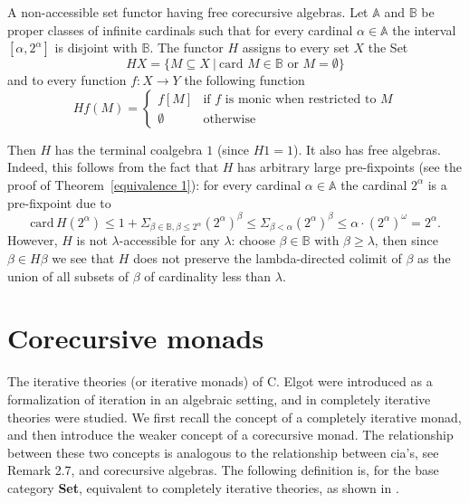 \documentclass{LMCS}
\theoremstyle{plain}
\theoremstyle{definition}
\numberwithin{equation}{section}
\def\card{\mathrm{card}\,}
\begin{document}
\begin{exa}
A non-accessible set functor having free corecursive algebras. Let $\mathbb A$ and $\mathbb B$ be proper classes of infinite cardinals such that for every cardinal $\alpha \in \mathbb A$ the interval $[\alpha,2^\alpha]$ is disjoint with $\mathbb B$. The functor $H$ assigns to every set $X$ the Set
$$HX=\{M\subseteq X\ |\ \text{card $M\in \mathbb B$ or $M=\emptyset$}\}$$
and to every function $f:X\to Y$ the following function
$$Hf(M)=\left \{ \begin{array}{ll}
f[M]& \text{if $f$ is monic when restricted to $M$}\\
\emptyset& \text{otherwise}
\end{array} \right. $$

Then $H$ has the terminal coalgebra $1$ (since $H1=1$). It also has free
algebras. Indeed, this follows from the fact that $H$ has arbitrary large pre-fixpoints (see the
proof of Theorem~\ref{equivalence 1}): for every cardinal $\alpha\in \mathbb A$ the cardinal $2^\alpha$ is a pre-fixpoint due to
$$\card H(2^\alpha)\leq1+\Sigma_{\beta\in \mathbb{B},\beta\leq 2^\alpha} (2^\alpha)^\beta\leq\Sigma_{\beta<\alpha} (2^\alpha)^\beta\leq\alpha\cdot(2^\alpha)^\omega=2^\alpha.$$
However, $H$ is not $\lambda$-accessible for any $\lambda$: choose
$\beta\in \mathbb B$ with $\beta\geq\lambda$, then since $\beta\in
H\beta$ we see that $H$ does not preserve the lambda-directed colimit
of $\beta$ as the union of all subsets of $\beta$ of cardinality less than $\lambda$.
\end{exa}

\section{Corecursive monads}
The iterative theories (or iterative monads) of C. Elgot \cite{elgot} were introduced as a formalization of iteration in an algebraic setting, and in \cite{ebt} completely iterative theories were studied. We first recall the concept of a completely iterative monad, and then introduce the weaker concept of a corecursive monad. The relationship between these two concepts is analogous to the relationship between cia's, see Remark 2.7, and corecursive algebras. The following definition is, for the base category {\bf Set}, equivalent to completely iterative theories, as shown in \cite{aamv}.
\end{document}
